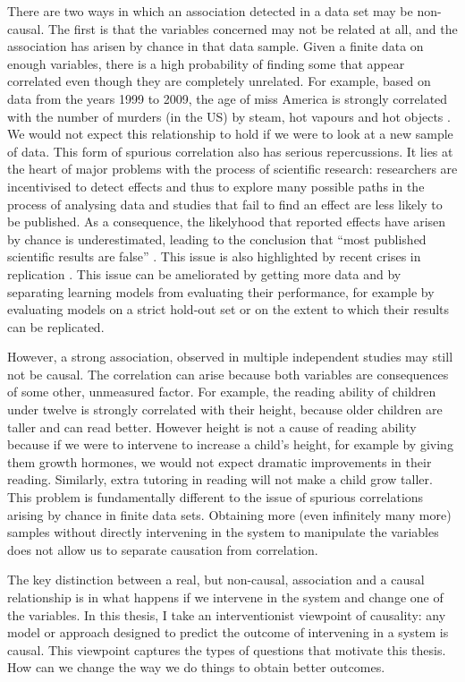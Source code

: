\documentclass[11pt,a4paper,oneside]{book}
\newcommand{\quotes}[1]{``#1''}
\theoremstyle{plain}
\theoremstyle{definition}
\begin{document}
There are two ways in which an association detected in a data set may be non-causal. The first is that the variables concerned may not be related at all, and the association has arisen by chance in that data sample. Given a finite data on enough variables, there is a high probability of finding some that appear correlated even though they are completely unrelated. For example, based on data from the years 1999 to 2009, the age of miss America is strongly correlated with the number of murders  (in the US) by steam, hot vapours and hot objects \citep{Vigen2015}. We would not expect this relationship to hold if we were to look at a new sample of data. This form of spurious correlation also has serious repercussions. It lies at the heart of major problems with the process of scientific research: researchers are incentivised to detect effects and thus to explore many possible paths in the process of analysing data and studies that fail to find an effect are less likely to be published. As a consequence, the likelyhood that reported effects have arisen by chance is underestimated, leading to the conclusion that \quotes{most published scientific results are false} \citep{Ioannidis2005}. This issue is also highlighted by recent crises in replication \citep{OpenScienceCollaboration2015}. This issue can be ameliorated by getting more data and by separating learning models from evaluating their performance, for example by evaluating models on a strict hold-out set or on the extent to which their results can be replicated. 

However, a strong association, observed in multiple independent studies may still not be causal. The correlation can arise because both variables are consequences of some other, unmeasured factor. For example, the reading ability of children under twelve is strongly correlated with their height, because older children are taller and can read better. However height is not a cause of reading ability because if we were to intervene to increase a child's height, for example by giving them growth hormones, we would not expect dramatic improvements in their reading. Similarly, extra tutoring in reading will not make a child grow taller. This problem is fundamentally different to the issue of spurious correlations arising by chance in finite data sets. Obtaining more (even infinitely many more) samples without directly intervening in the system to manipulate the variables does not allow us to separate causation from correlation. 

The key distinction between a real, but non-causal, association and a causal relationship is in what happens if we intervene in the system and change one of the variables. In this thesis, I take an interventionist viewpoint of causality: any model or approach designed to predict the outcome of intervening in a system is causal. This viewpoint captures the types of questions that motivate this thesis. How can we change the way we do things to obtain better outcomes. 
\end{document}
